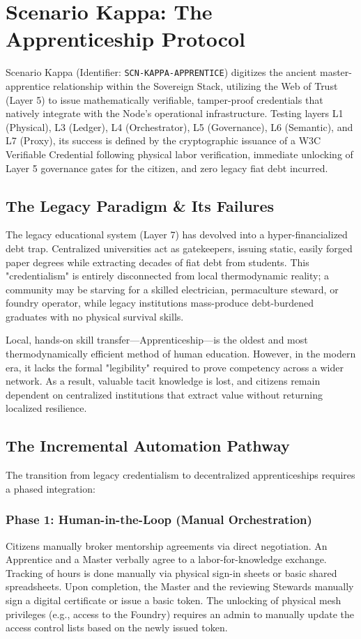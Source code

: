 \chapter{Scenario Kappa: The Apprenticeship Protocol}
\label{ch:scenario_kappa}

Scenario Kappa (Identifier: \texttt{SCN-KAPPA-APPRENTICE}) digitizes the ancient master-apprentice relationship within the Sovereign Stack, utilizing the Web of Trust (Layer 5) to issue mathematically verifiable, tamper-proof credentials that natively integrate with the Node's operational infrastructure. Testing layers L1 (Physical), L3 (Ledger), L4 (Orchestrator), L5 (Governance), L6 (Semantic), and L7 (Proxy), its success is defined by the cryptographic issuance of a W3C Verifiable Credential following physical labor verification, immediate unlocking of Layer 5 governance gates for the citizen, and zero legacy fiat debt incurred.

\section{The Legacy Paradigm \& Its Failures}
The legacy educational system (Layer 7) has devolved into a hyper-financialized debt trap. Centralized universities act as gatekeepers, issuing static, easily forged paper degrees while extracting decades of fiat debt from students. This "credentialism" is entirely disconnected from local thermodynamic reality; a community may be starving for a skilled electrician, permaculture steward, or foundry operator, while legacy institutions mass-produce debt-burdened graduates with no physical survival skills.

Local, hands-on skill transfer---Apprenticeship---is the oldest and most thermodynamically efficient method of human education. However, in the modern era, it lacks the formal "legibility" required to prove competency across a wider network. As a result, valuable tacit knowledge is lost, and citizens remain dependent on centralized institutions that extract value without returning localized resilience.

\section{The Incremental Automation Pathway}
The transition from legacy credentialism to decentralized apprenticeships requires a phased integration:

\subsection{Phase 1: Human-in-the-Loop (Manual Orchestration)}
Citizens manually broker mentorship agreements via direct negotiation. An Apprentice and a Master verbally agree to a labor-for-knowledge exchange. Tracking of hours is done manually via physical sign-in sheets or basic shared spreadsheets. Upon completion, the Master and the reviewing Stewards manually sign a digital certificate or issue a basic token. The unlocking of physical mesh privileges (e.g., access to the Foundry) requires an admin to manually update the access control lists based on the newly issued token.


